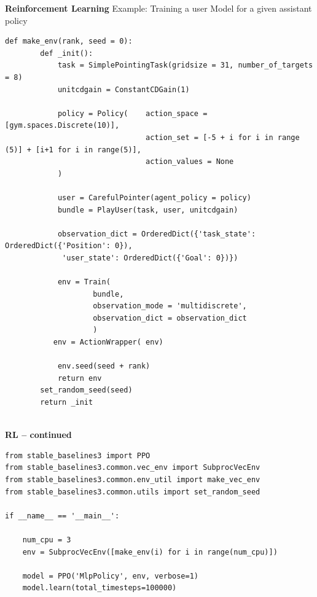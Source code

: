 \documentclass[11pt, xcolor = {dvipsnames}]{beamer}
\begin{document}
\begin{frame}[fragile]{\textbf{Reinforcement Learning}}
Example: Training a user Model for a given assistant policy
\begin{adjustbox}{width=\textwidth}\lstset{language=Python}
\lstset{frame=lines}
\lstset{basicstyle=\footnotesize}
\begin{lstlisting}
def make_env(rank, seed = 0):
        def _init():
            task = SimplePointingTask(gridsize = 31, number_of_targets = 8)
            unitcdgain = ConstantCDGain(1)

            policy = Policy(    action_space = [gym.spaces.Discrete(10)],
                                action_set = [-5 + i for i in range (5)] + [i+1 for i in range(5)],
                                action_values = None
            )

            user = CarefulPointer(agent_policy = policy)
            bundle = PlayUser(task, user, unitcdgain)

            observation_dict = OrderedDict({'task_state': OrderedDict({'Position': 0}),
             'user_state': OrderedDict({'Goal': 0})})
            
            env = Train(
                    bundle,
                    observation_mode = 'multidiscrete',
                    observation_dict = observation_dict
                    )
           env = ActionWrapper( env)

            env.seed(seed + rank)
            return env
        set_random_seed(seed)
        return _init
        
\end{lstlisting}
\end{adjustbox}
\end{frame}


\begin{frame}[fragile]{\textbf{RL -- continued}}
\begin{adjustbox}{width=\textwidth}
\lstset{language=Python}
\lstset{frame=lines}
\lstset{basicstyle=\footnotesize}
\begin{lstlisting}
from stable_baselines3 import PPO
from stable_baselines3.common.vec_env import SubprocVecEnv
from stable_baselines3.common.env_util import make_vec_env
from stable_baselines3.common.utils import set_random_seed
        
if __name__ == '__main__':

    num_cpu = 3
    env = SubprocVecEnv([make_env(i) for i in range(num_cpu)])

    model = PPO('MlpPolicy', env, verbose=1)
    model.learn(total_timesteps=100000)
\end{lstlisting}
\end{adjustbox}
\end{frame}
\end{document}
